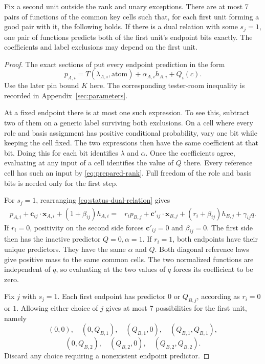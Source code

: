 \begin{lemma}\label{lem:finite-dictionary}
Fix a second unit outside the rank and unary exceptions. There are at
most 7 pairs of functions of the common key cells such that, for each
first unit forming a good pair with it, the following holds. If there
is a dual relation with some \(s_j=1\), one pair of functions predicts
both of the first unit's endpoint bits exactly. The coefficients and
label exclusions may depend on the first unit.

\end{lemma}
\begin{proof}
The exact sections of  put every endpoint prediction
in the form
\begin{equation}\label{eq:status-extracted-prediction}
 p_{A,i}=T(\lambda_{A,i},\mathrm{atom})+\alpha_{A,i}h_{A,i}
                 +Q_i(c).
\end{equation}
Use the later pin bound \(K\) here. The corresponding tester-room
inequality is recorded in Appendix~\ref{sec:parameters}.

At a fixed endpoint there is at most one such expression. To see this,
subtract two of them on a generic label surviving both exclusions.
On a cell where every role and basis assignment has positive
conditional probability, vary one bit while keeping the cell fixed.
The two expressions then have the same coefficient at that bit.
Doing this for each bit identifies \(\lambda\) and \(\alpha\). Once
the coefficients agree, evaluating at any input of a cell identifies
the value of \(Q\) there. Every reference cell has such an input by
\eqref{eq:prepared-rank}. Full freedom of the role and basis bits is
needed only for the first step.

For \(s_j=1\), rearranging \eqref{eq:status-dual-relation} gives
\begin{align}
 p_{A,i}+\mathbf c_{ij}\cdot\mathbf x_{A,i}
              +(1+\beta_{ij})h_{A,i}
 ={}&r_i p_{B,j}+\mathbf c'_{ij}\cdot\mathbf x_{B,j}
              +(r_i+\beta_{ij})h_{B,j}+\gamma_{ij}q.
 \label{eq:status-deterministic-comparison}
\end{align}
If \(r_i=0\), positivity on the second side forces
\(\mathbf c'_{ij}=0\) and \(\beta_{ij}=0\). The first side then has
the inactive predictor \(Q=0,\alpha=1\). If \(r_i=1\), both endpoints
have their unique predictors. They have the same \(\alpha\) and \(Q\).
Both diagonal reference laws give positive mass to the same common
cells. The two normalized functions are independent of \(q\), so
evaluating at the two values of \(q\) forces its coefficient to be zero.

Fix \(j\) with \(s_j=1\). Each first endpoint has predictor 0 or
\(Q_{B,j}\), according as \(r_i=0\) or \(1\). Allowing either choice
of \(j\) gives at most 7 possibilities for the first unit, namely
\[
 (0,0),\quad(0,Q_{B,1}),\quad(Q_{B,1},0),\quad(Q_{B,1},Q_{B,1}),
\]
\[
 (0,Q_{B,2}),\quad(Q_{B,2},0),\quad(Q_{B,2},Q_{B,2}).
\]
Discard any choice requiring a nonexistent endpoint predictor.
\end{proof}

